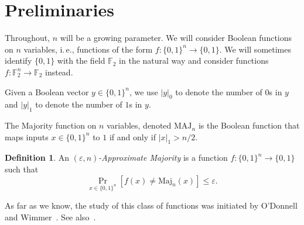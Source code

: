 \documentclass[11pt]{article}
\numberwithin{equation}{section}
\theoremstyle{definition}
\newtheorem{definition}[theorem]{Definition}
\theoremstyle{plain}
\newcommand{\ie}{i.\,e.}
\newcommand{\prob}[2]{\mathop{\mathrm{Pr}}_{#1}[#2]}
\newcommand{\F}{\mathbb{F}}
\newcommand{\Maj}{\mathrm{Maj}}
\begin{document}
\section{Preliminaries}

Throughout, $n$ will be a growing parameter. We will consider Boolean functions on $n$ variables, \ie, functions of the form $f:\{0,1\}^n\rightarrow \{0,1\}$. We will sometimes identify $\{0,1\}$ with the field $\F_2$ in the natural way and consider functions $f:\F_2^n \rightarrow \F_2$ instead.

%
%
%
%
%
%
%
%

Given a Boolean vector $y\in \{0,1\}^n$, we use $|y|_0$ to denote the number of $0$s in $y$ and $|y|_1$ to denote the number of $1$s in $y$.
%
%


The Majority function on $n$ variables, denoted $\mathrm{MAJ}_n$ is the
Boolean function that maps inputs $x\in \{0,1\}^n$ to $1$ if and
only if $|x|_1 > n/2$. 

\begin{definition}
\label{defn:approx-maj}
%
%
An \emph{$(\varepsilon,n)$-Approximate Majority} is a function $f:\{0,1\}^n\rightarrow \{0,1\}$ such that
\[
  \prob{x \in \{0,1\}^n}{f(x) \neq \Maj_n(x)} \leq \varepsilon.
\]
\end{definition}

As far as we know, the study of this class of functions was initiated by O'Donnell and Wimmer~\cite{odonnellwimmer}. See also~\cite{Amano-appxmaj, BlaisTan}.
\end{document}
